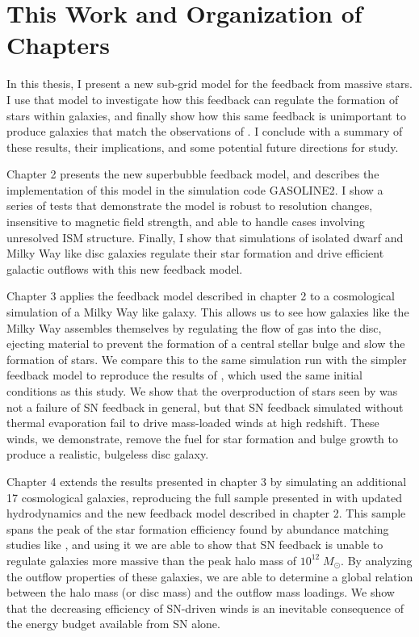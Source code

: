 \section{This Work and Organization of Chapters}
In this thesis, I present a new sub-grid model for the feedback from massive
stars.  I use that model to investigate how this feedback can regulate the
formation of stars within galaxies, and finally show how this same feedback is
unimportant to produce galaxies that match the observations of
\citet{McGaugh2016}.  I conclude with a summary of these results, their
implications, and some potential future directions for study.

Chapter 2 presents the new superbubble feedback model, and describes the
implementation of this model in the simulation code {\sc GASOLINE2}.  I show a
series of tests that demonstrate the model is robust to resolution changes, insensitive
to magnetic field strength, and able to handle cases involving unresolved ISM
structure.  Finally, I show that simulations of isolated dwarf and Milky Way
like disc galaxies regulate their star formation and drive efficient galactic
outflows with this new feedback model.

Chapter 3 applies the feedback model described in chapter 2 to a cosmological
simulation of a Milky Way like galaxy.  This allows us to see how galaxies like
the Milky Way assembles themselves by regulating the flow of gas into the disc,
ejecting material to prevent the formation of a central stellar bulge and slow
the formation of stars.  We compare this to the same simulation run with the
simpler \citet{Stinson2006} feedback model to reproduce the results of
\citet{Stinson2010}, which used the same initial conditions as this study.  We
show that the overproduction of stars seen by \citet{Stinson2010} was not a
failure of SN feedback in general, but that SN feedback simulated without 
thermal evaporation fail to drive mass-loaded winds at high redshift.  These
winds, we demonstrate, remove the fuel for star formation and bulge growth to
produce a realistic, bulgeless disc galaxy.

Chapter 4 extends the results presented in chapter 3 by simulating an additional
17 cosmological galaxies, reproducing the full sample presented in
\citet{Stinson2010} with updated hydrodynamics and the new feedback model
described in chapter 2.  This sample spans the peak of the star formation
efficiency found by abundance matching studies like \citet{Moster2013}, and
using it we are able to show that SN feedback is unable to regulate
galaxies more massive than the peak halo mass of $10^{12}\;M_\odot$.  By
analyzing the outflow properties of these galaxies, we are able to determine a
global relation between the halo mass (or disc mass) and the outflow mass
loadings.  We show that the decreasing efficiency of SN-driven winds is an
inevitable consequence of the energy budget available from SN alone.

